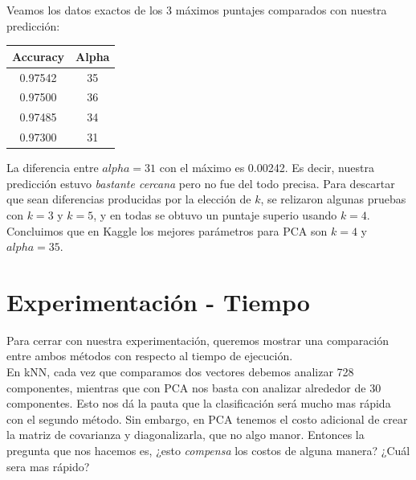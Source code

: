 Veamos los datos exactos de los 3 máximos puntajes comparados con nuestra predicción: \\

\begin{center}
    \begin{tabular}{| c | c |}
    \hline
     Accuracy    & Alpha  \\ \hline
     0.97542  & 35  \\ \hline
     0.97500  & 36  \\ \hline
     0.97485  & 34  \\ \hline
     0.97300  & 31  \\ \hline
    \end{tabular}
\end{center}

La diferencia entre $alpha=31$ con el máximo es 0.00242. Es decir, nuestra predicción estuvo \textit{bastante cercana} pero no fue del todo precisa. Para descartar que sean diferencias producidas por la elección de $k$, se relizaron algunas pruebas con $k=3$ y $k=5$, y en todas se obtuvo un puntaje superio usando $k=4$. Concluimos que en Kaggle los mejores parámetros para PCA son $k=4$ y $alpha=35$.  \\

\newpage
\section{Experimentación - Tiempo}

Para cerrar con nuestra experimentación, queremos mostrar una comparación entre ambos métodos con respecto al tiempo de ejecución. \\

En kNN, cada vez que comparamos dos vectores debemos analizar 728 componentes, mientras que con PCA nos basta con analizar alrededor de 30 componentes. Esto nos dá la pauta que la clasificación será mucho mas rápida con el segundo método. Sin embargo, en PCA tenemos el costo adicional de crear la matriz de covarianza y diagonalizarla, que no algo manor. Entonces la pregunta que nos hacemos es, ¿esto \textit{compensa} los costos de alguna manera? ¿Cuál sera mas rápido? \\

